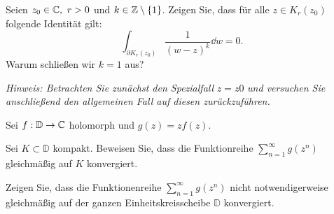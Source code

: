 \begin{Problem}
	Seien $z_0\in \mathbb{C},~r>0$ und $k\in \mathbb{Z}\setminus \{1\} $. Zeigen Sie, dass f\"{u}r alle $z\in K_r(z_0)$ folgende Identität gilt:
	\[
		\int_{\partial K_r(z_0)}\frac{1}{(w-z)^k}\dd{w}=0
	.\] 
	Warum schließen wir $k=1$ aus?

	\emph{Hinweis: Betrachten Sie zunächst den Spezialfall} $z=z0$ \emph{und versuchen Sie anschließend den allgemeinen Fall auf diesen zurückzuführen.}
\end{Problem}

\begin{Problem}
	Sei $f:\mathbb{D}\to \mathbb{C}$ holomorph und $g(z)=zf(z)$.
	\begin{parts}
	\item Sei $K\subset \mathbb{D}$ kompakt. Beweisen Sie, dass die Funktionreihe $\sum_{n=1}^\infty g(z^n)$ gleichmäßig auf $K$ konvergiert.
	\item Zeigen Sie, dass die Funktionenreihe $\sum_{n=1}^\infty g(z^n)$ nicht notwendigerweise gleichmäßig auf der ganzen Einheitskreisscheibe $\mathbb{D}$ konvergiert.
	\end{parts}
\end{Problem}
